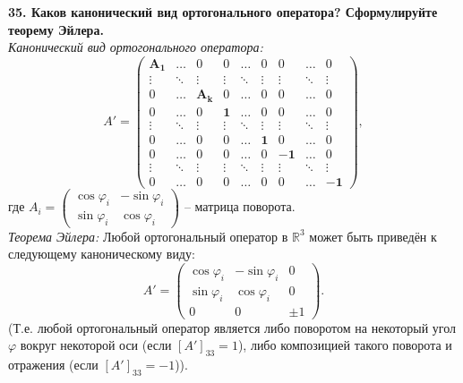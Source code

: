 \documentclass[11pt,a4paper]{article}
\newcommand{\R}{\mathbb{R}}
\begin{document}
\textbf{35. Каков канонический вид ортогонального оператора? Сформулируйте теорему Эйлера.\\}
\textit{Канонический вид ортогонального оператора:}
$$A' = \left( \begin{matrix}
\mathbf{A_1} & \hdots &        0       &      0     & \hdots &      0     &      0      & \hdots &      0   \\
    \vdots     & \ddots &     \vdots     &   \vdots   & \ddots &   \vdots   &   \vdots    & \ddots &   \vdots \\
       0       & \hdots & \mathbf{A_k} &      0     & \hdots &      0     &      0      & \hdots &      0   \\
       0       & \hdots &        0       & \mathbf{1} & \hdots &      0     &      0      & \hdots &      0   \\
    \vdots     & \ddots &     \vdots     &   \vdots   & \ddots &   \vdots   &   \vdots    & \ddots &   \vdots \\
       0       & \hdots &        0       &      0     & \hdots & \mathbf{1} &      0      & \hdots &      0   \\
       0       & \hdots &        0       &      0     & \hdots &      0     & \mathbf{-1} & \hdots &      0   \\
    \vdots     & \ddots &     \vdots     &   \vdots   & \ddots &   \vdots   &   \vdots    & \ddots &   \vdots \\
       0       & \hdots &        0       &      0     & \hdots &      0     &      0      & \hdots & \mathbf{-1}    
\end{matrix} \right),$$
где $A_i = \left( \begin{matrix}
\cos \varphi_i & -\sin \varphi_i \\
\sin \varphi_i &  \cos \varphi_i
\end{matrix} \right)$ -- матрица поворота.\\
\textit{Теорема Эйлера:} Любой ортогональный оператор в $\R^3$ может быть приведён к следующему каноническому виду:
$$A' = \left( \begin{matrix}
\cos \varphi_i & -\sin \varphi_i &   0   \\
\sin \varphi_i &  \cos \varphi_i &   0   \\
       0       &         0       & \pm 1
\end{matrix} \right).$$
(Т.е. любой ортогональный оператор является либо поворотом на некоторый угол $\varphi$ вокруг некоторой оси (если $[A']_{33} = 1$), либо композицией такого поворота и отражения (если $[A']_{33} = -1$)).
\end{document}

